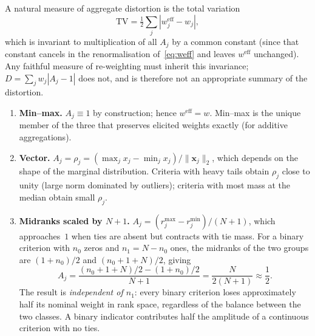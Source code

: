 \begin{corollary}
\label{cor:three}

A natural measure of aggregate distortion is the total variation
\begin{equation}
  \label{eq:TV}
  \mathrm{TV} = \tfrac{1}{2}\sum_j |w_j^{\mathrm{eff}} - w_j|,
\end{equation}
which is invariant to multiplication of all $A_j$ by a common constant
(since that constant cancels in the renormalisation of~\eqref{eq:weff}
and leaves $w^{\mathrm{eff}}$ unchanged).
Any faithful measure of re-weighting must inherit this invariance;
$D = \sum_j w_j |A_j - 1|$ does not, and is therefore not an
appropriate summary of the distortion.

\begin{enumerate}[label=(\roman*)]
  \item \textbf{Min--max.}
    $A_j \equiv 1$ by construction; hence $w^{\mathrm{eff}} = w$.
    Min--max is the unique member of the three that preserves elicited
    weights exactly (for additive aggregations).
  \item \textbf{Vector.}
    $A_j = \rho_j = (\max_j x_j - \min_j x_j) / \lVert\mathbf{x}_j\rVert_2$,
    which depends on the shape of the marginal distribution.
    Criteria with heavy tails obtain $\rho_j$ close to unity (large
    norm dominated by outliers); criteria with most mass at the median
    obtain small $\rho_j$.
  \item \textbf{Midranks scaled by $N+1$.}
    $A_j = (r_j^{\max} - r_j^{\min})/(N+1)$, which approaches~$1$
    when ties are absent but contracts with tie mass.
    For a binary criterion with $n_0$ zeros and $n_1 = N-n_0$ ones,
    the midranks of the two groups are $(1+n_0)/2$ and $(n_0+1+N)/2$,
    giving
    \begin{equation}
      A_j = \frac{(n_0+1+N)/2 - (1+n_0)/2}{N+1} = \frac{N}{2(N+1)} \approx \frac{1}{2}.
    \end{equation}
    The result is \emph{independent of $n_1$}: every binary criterion
    loses approximately half its nominal weight in rank space, regardless
    of the balance between the two classes.
    A binary indicator contributes half the amplitude of a continuous
    criterion with no ties.
\end{enumerate}
\end{corollary}

